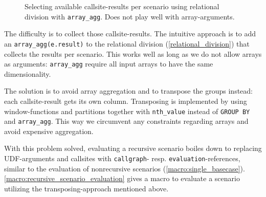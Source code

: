 \begin{figure}[h!]\centering
  \caption{Selecting available callsite-results per scenario using relational division with \texttt{array\_agg}. Does not play well with array-arguments.}
  \label{relational_division}
\end{figure}

The difficulty is to collect those callsite-results. The intuitive approach is to add an \texttt{array\_agg(e.result)} to the relational division (\autoref{relational_division}) that collects the results per scenario. This works well as long as we do not allow arrays as arguments: \texttt{array\_agg} require all input arrays to have the same dimensionality.

The solution is to avoid array aggregation and to transpose the groups instead: each callsite-result gets its own column. Transposing is implemented by using window-functions and partitions together with \texttt{nth\_value} instead of \texttt{GROUP BY} and \texttt{array\_agg}. This way we circumvent any constraints regarding arrays and avoid expensive aggregation.

With this problem solved, evaluating a recursive scenario boiles down to replacing UDF-arguments and callsites with \texttt{callgraph}- resp. \texttt{evaluation}-references, similar to the evaluation of nonrecursive scenarios (\autoref{macro:single_basecase}). \autoref{macro:recursive_scenario_evaluation} gives a macro to evaluate a scenario utilizing the transposing-approach mentioned above.

